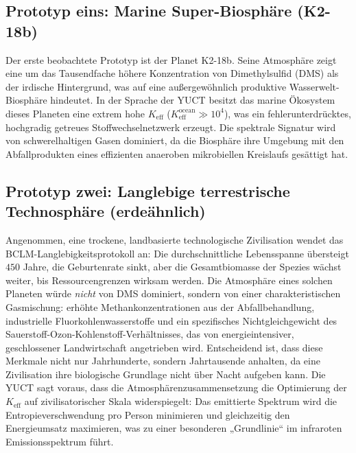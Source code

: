 \documentclass[11pt,a4paper]{article}
\begin{document}
	\subsection{Prototyp eins: Marine Super-Biosphäre (K2-18b)}
	Der erste beobachtete Prototyp ist der Planet K2-18b. Seine Atmosphäre zeigt eine um das Tausendfache höhere Konzentration von Dimethylsulfid (DMS) als der irdische Hintergrund, was auf eine außergewöhnlich produktive Wasserwelt-Biosphäre hindeutet. In der Sprache der YUCT besitzt das marine Ökosystem dieses Planeten eine extrem hohe \(K_{\mathrm{eff}}\) (\(K_{\mathrm{eff}}^{\mathrm{ocean}} \gg 10^4\)), was ein fehlerunterdrücktes, hochgradig getreues Stoffwechselnetzwerk erzeugt. Die spektrale Signatur wird von schwerelhaltigen Gasen dominiert, da die Biosphäre ihre Umgebung mit den Abfallprodukten eines effizienten anaeroben mikrobiellen Kreislaufs gesättigt hat.
	
	\subsection{Prototyp zwei: Langlebige terrestrische Technosphäre (erdeähnlich)}
	Angenommen, eine trockene, landbasierte technologische Zivilisation wendet das BCLM-Langlebigkeitsprotokoll an: Die durchschnittliche Lebensspanne übersteigt \(450\) Jahre, die Geburtenrate sinkt, aber die Gesamtbiomasse der Spezies wächst weiter, bis Ressourcengrenzen wirksam werden. Die Atmosphäre eines solchen Planeten würde \emph{nicht} von DMS dominiert, sondern von einer charakteristischen Gasmischung: erhöhte Methankonzentrationen aus der Abfallbehandlung, industrielle Fluorkohlenwasserstoffe und ein spezifisches Nichtgleichgewicht des Sauerstoff-Ozon-Kohlenstoff-Verhältnisses, das von energieintensiver, geschlossener Landwirtschaft angetrieben wird. Entscheidend ist, dass diese Merkmale nicht nur Jahrhunderte, sondern Jahrtausende anhalten, da eine Zivilisation ihre biologische Grundlage nicht über Nacht aufgeben kann. Die YUCT sagt voraus, dass die Atmosphärenzusammensetzung die Optimierung der \(K_{\mathrm{eff}}\) auf zivilisatorischer Skala widerspiegelt: Das emittierte Spektrum wird die Entropieverschwendung pro Person minimieren und gleichzeitig den Energieumsatz maximieren, was zu einer besonderen „Grundlinie“ im infraroten Emissionsspektrum führt.
	
\end{document}
